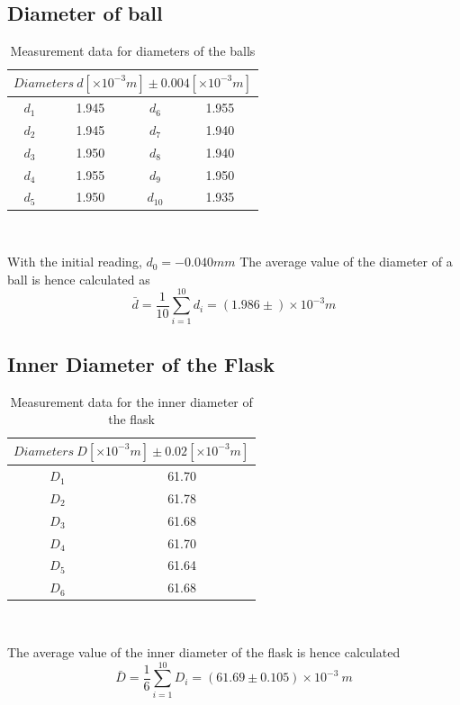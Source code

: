 \documentclass[12pt]{article}
\begin{document}
    \subsection{Diameter of ball}
        \begin{table}[htbp]
        \centering
        \begin{tabular}{|c|c|c|c|}
            \hline
            \multicolumn{4}{|c|}{ $Diameters\ d[\times10^{-3}m] \pm 0.004[\times10^{-3}m]$}\\
            \hline
            $d_1$ &1.945 &$d_6$ &1.955\\
            \hline
            $d_2$ &1.945 &$d_7$ &1.940\\
            \hline
            $d_3$ &1.950 &$d_8$ &1.940\\
            \hline
            $d_4$ &1.955 &$d_9$ &1.950\\
            \hline
            $d_5$ &1.950 &$d_{10}$ &1.935\\         
            \hline
        \end{tabular}\\
        \caption{Measurement data for diameters of the balls}
        \label{balldiameter}
    \end{table}     
    With the initial reading, $d_0 = -0.040 mm$
    The average value of the diameter of a ball is hence calculated as
    \[
        \bar{d}=\frac{1}{10}\sum_{i=1}^{10}d_i=(1.986\pm )\times10^{-3}m
    \]
    \subsection{Inner Diameter of the Flask}
    \begin{table}[htbp]
        \centering
        \begin{tabular}{|c|c|}
            \hline
            \multicolumn{2}{|c|}{$Diameters\ D[\times10^{-3}m] \pm 0.02[\times10^{-3}m]$}\\
            \hline
            $D_1$ & 61.70\\
            \hline
            $D_2$ & 61.78\\
            \hline
            $D_3$ & 61.68\\
            \hline
            $D_4$ & 61.70\\
            \hline
            $D_5$ & 61.64\\
            \hline
            $D_6$ & 61.68\\ 
            \hline          
        \end{tabular}\\
        \caption{Measurement data for the inner diameter of the flask}
        \label{innerdiameter}
    \end{table}
    \newpage
    The average value of the inner diameter of the flask is hence calculated 
    \[
        \bar{D}=\frac{1}{6}\sum_{i=1}^{10}D_i=(61.69\pm0.105)\times10^{-3}\ m
    \]
\end{document}
